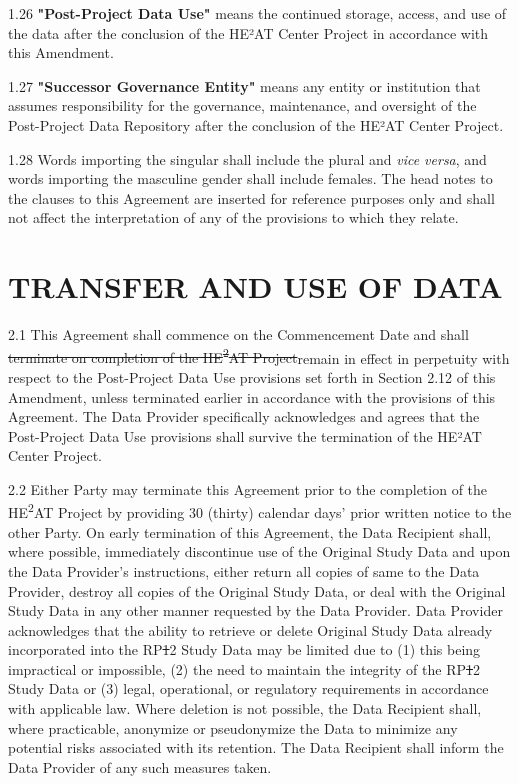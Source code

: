 \documentclass[12pt,letterpaper]{article}
\newcommand{\deleted}[1]{\textcolor{deletecolor}{\sout{#1}}}
\newcommand{\added}[1]{\textcolor{addcolor}{#1}}
\begin{document}
\added{1.26 \textbf{"Post-Project Data Use"} means the continued storage, access, and use of the data after the conclusion of the HE²AT Center Project in accordance with this Amendment.}

\added{1.27 \textbf{"Successor Governance Entity"} means any entity or institution that assumes responsibility for the governance, maintenance, and oversight of the Post-Project Data Repository after the conclusion of the HE²AT Center Project.}

1.28 Words importing the singular shall include the plural and \textit{vice versa}, and words importing the masculine gender shall include females. The head notes to the clauses to this Agreement are inserted for reference purposes only and shall not affect the interpretation of any of the provisions to which they relate.

\section{TRANSFER AND USE OF DATA}

2.1 This Agreement shall commence on the Commencement Date and shall \deleted{terminate on completion of the HE\textsuperscript{2}AT Project}\added{remain in effect in perpetuity with respect to the Post-Project Data Use provisions set forth in Section 2.12 of this Amendment, unless terminated earlier in accordance with the provisions of this Agreement. The Data Provider specifically acknowledges and agrees that the Post-Project Data Use provisions shall survive the termination of the HE²AT Center Project}.

2.2 Either Party may terminate this Agreement prior to the completion of the HE\textsuperscript{2}AT Project by providing 30 (thirty) calendar days' prior written notice to the other Party. On early termination of this Agreement, the Data Recipient shall, where possible, immediately discontinue use of the Original Study Data and upon the Data Provider's instructions, either return all copies of same to the Data Provider, destroy all copies of the Original Study Data, or deal with the Original Study Data in any other manner requested by the Data Provider. Data Provider acknowledges that the ability to retrieve or delete Original Study Data already incorporated into the RP\deleted{1}\added{2} Study Data may be limited due to (1) this being impractical or impossible, (2) the need to maintain the integrity of the RP\deleted{1}\added{2} Study Data or (3) legal, operational, or regulatory requirements in accordance with applicable law. Where deletion is not possible, the Data Recipient shall, where practicable, anonymize or pseudonymize the Data to minimize any potential risks associated with its retention. The Data Recipient shall inform the Data Provider of any such measures taken.
\end{document}
